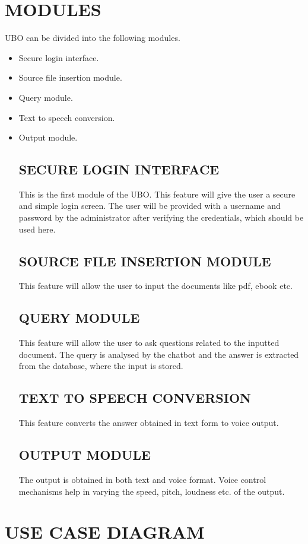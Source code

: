 \documentclass[12pt,a4paper,oneside]{report}
\begin{document}
\section{MODULES}
UBO can be divided  into the following modules.
\begin{itemize}
\item{Secure login interface.}
\item{Source file insertion module. }
\item{Query module.}
\item{Text to speech conversion.}
\item{Output module.}
\subsection{SECURE LOGIN INTERFACE}
\par This is the first module of the UBO. This feature will give the user a secure and simple login screen. The user will be provided
with a username and password by the administrator after verifying the credentials, which should
be used here.
\subsection{SOURCE FILE INSERTION MODULE}
This feature will allow the user to input the documents like pdf, ebook etc.
\subsection{QUERY MODULE}
This feature will allow the user to ask questions related to the inputted document. The
query is analysed by the chatbot and the answer is extracted from the database, where the input
is stored.
\subsection{TEXT TO SPEECH CONVERSION}
This feature converts the answer obtained in text form to voice output.
\subsection{OUTPUT MODULE}
The output is obtained in both text and voice format. Voice control mechanisms help in
varying the speed, pitch, loudness etc. of the output.
\end{itemize}
\section{USE CASE DIAGRAM}
\end{document}
